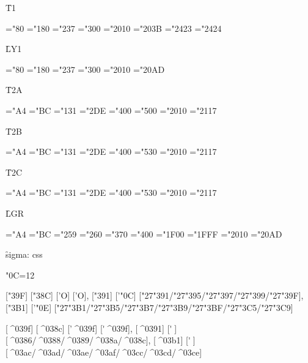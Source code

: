{\f T1}

\ToneZZZSerifRegular
\ChrA="80 \ChrB="180
\PrintCode
\ChrA="237 \ChrB="300
\PrintCode
\ChrA="2010 \ChrB="203B
\PrintCode
\ChrA="2423 \ChrB="2424
\PrintCode

{\f LY1}

\LYoneZZZSerifRegular
\ChrA="80 \ChrB="180
\PrintCode
\ChrA="237 \ChrB="300
\PrintCode
\ChrA="2010 \ChrB="20AD
\PrintCode

{\f T2A}

\TtwoaZZZSerifRegular
\ChrA="A4 \ChrB="BC
\PrintCode
\ChrA="131 \ChrB="2DE
\PrintCode
\ChrA="400 \ChrB="500
\PrintCode
\ChrA="2010 \ChrB="2117
\PrintCode

{\f T2B}

\TtwobZZZSerifRegular
\ChrA="A4 \ChrB="BC
\PrintCode
\ChrA="131 \ChrB="2DE
\PrintCode
\ChrA="400 \ChrB="530
\PrintCode
\ChrA="2010 \ChrB="2117
\PrintCode

{\f T2C}

\TtwocZZZSerifRegular
\ChrA="A4 \ChrB="BC
\PrintCode
\ChrA="131 \ChrB="2DE
\PrintCode
\ChrA="400 \ChrB="530
\PrintCode
\ChrA="2010 \ChrB="2117
\PrintCode

{\f LGR}

\LgrZZZSerifRegular
\ChrA="A4 \ChrB="BC
\PrintCode
\ChrA="259 \ChrB="260
\PrintCode
\ChrA="370 \ChrB="400
\PrintCode
\ChrA="1F00 \ChrB="1FFF
\PrintCode
\ChrA="2010 \ChrB="20AD
\PrintCode

{\f sigma:} ^^63^^73^^73

\catcode"0C=12

[\char"39F] [\char"38C] ['\relax Ο] ['Ο],
[\char"391] ['\char"0C] [\char"27\char"391/\char"27\char"395/\char"27\char"397/\char"27\char"399/\char"27\char"39F],
[\char"3B1] ['\char"0E] [\char"27\char"3B1/\char"27\char"3B5/\char"27\char"3B7/\char"27\char"3B9/\char"27\char"3BF/\char"27\char"3C5/\char"27\char"3C9]

[^^^^039f] [^^^^038c] ['\relax ^^^^039f] [^^27^^^^039f],
[^^^^0391] [^^27^^0c] [^^^^0386/^^^^0388/^^^^0389/^^^^038a/^^^^038c],
[^^^^03b1] [^^27^^0e] [^^^^03ac/^^^^03ad/^^^^03ae/^^^^03af/^^^^03cc/^^^^03cd/^^^^03ce]

\bye
